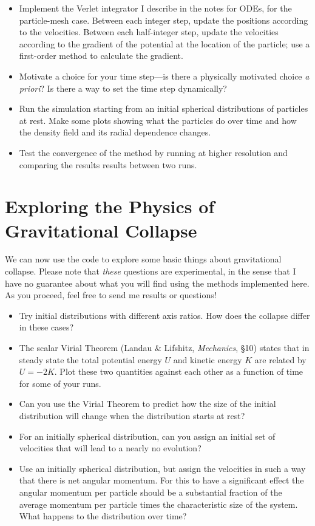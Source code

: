 \documentclass[11pt, preprint]{aastex}
\begin{document}
\begin{itemize}
\item Implement the Verlet integrator I describe in the notes for
  ODEs, for the particle-mesh case. Between each integer step,
  update the positions according to the velocities. Between each
  half-integer step, update the velocities according to the gradient
  of the potential at the location of the particle; use a first-order
  method to calculate the gradient. 
\item Motivate a choice for your time step---is there a physically
  motivated choice {\it a priori}? Is there a way to set the time step
  dynamically? 
\item Run the simulation starting from an initial spherical
  distributions of particles at rest. Make some plots showing what the
  particles do over time and how the density field and its radial
  dependence changes. 
\item Test the convergence of the method by running at higher
  resolution and comparing the results results between two runs.
\end{itemize}

\section{Exploring the Physics of Gravitational Collapse}

We can now use the code to explore some basic things about
gravitational collapse. Please note that {\it these} questions are
experimental, in the sense that I have no guarantee about what you
will find using the methods implemented here. As you proceed, feel
free to send me results or questions!

\begin{itemize}  
\item Try initial distributions with different axis ratios. How does
  the collapse differ in these cases?
\item The scalar Virial Theorem (Landau \& Lifshitz, {\it Mechanics},
  \S10) states that in steady state the total potential energy $U$ and
  kinetic energy $K$ are related by $U = -2K$. Plot these two
  quantities against each other as a function of time for some of your
  runs.
\item Can you use the Virial Theorem to predict how the size of the
  initial distribution will change when the distribution starts at
  rest?
\item For an initially spherical distribution, can you assign an
  initial set of velocities that will lead to a nearly no evolution? 
\item Use an initially spherical distribution, but assign the
  velocities in such a way that there is net angular momentum. For
  this to have a significant effect the angular momentum per particle
  should be a substantial fraction of the average momentum per
  particle times the characteristic size of the system. What happens
  to the distribution over time?
\end{itemize}
\end{document}
